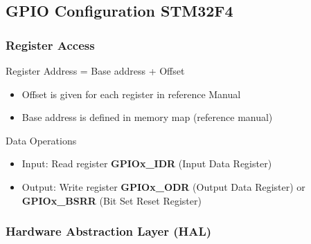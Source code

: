 \raggedcolumns
\columnbreak






\subsection{GPIO Configuration STM32F4}

\subsubsection{Register Access}

\begin{theorem}{Register Address} = Base address + Offset
    \begin{itemize}
        \item Offset is given for each register in reference Manual
        \item Base address is defined in memory map (reference manual)
    \end{itemize}
\end{theorem}

\begin{corollary}{Data Operations}
    \begin{itemize}
        \item Input: Read register \textbf{GPIOx\_IDR} (Input Data Register)
        \item Output: Write register \textbf{GPIOx\_ODR} (Output Data Register) or \textbf{GPIOx\_BSRR} (Bit Set Reset Register)
    \end{itemize}
\end{corollary}



\subsubsection{Hardware Abstraction Layer (HAL)}

